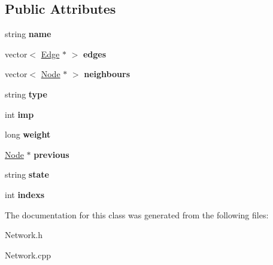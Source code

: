 \subsection*{\-Public \-Attributes}
\begin{DoxyCompactItemize}
\item 
\hypertarget{classNode_a4cd656d544174479df27f0759e5a3997}{string {\bfseries name}}\label{classNode_a4cd656d544174479df27f0759e5a3997}

\item 
\hypertarget{classNode_aae9ee63313be552829fe7004d4e47d7a}{vector$<$ \hyperlink{classEdge}{\-Edge} $\ast$ $>$ {\bfseries edges}}\label{classNode_aae9ee63313be552829fe7004d4e47d7a}

\item 
\hypertarget{classNode_adf620aca7a06a8e47c501e048fcfec6e}{vector$<$ \hyperlink{classNode}{\-Node} $\ast$ $>$ {\bfseries neighbours}}\label{classNode_adf620aca7a06a8e47c501e048fcfec6e}

\item 
\hypertarget{classNode_a4a9009dc3c11cefb48a2874cc40d4a8d}{string {\bfseries type}}\label{classNode_a4a9009dc3c11cefb48a2874cc40d4a8d}

\item 
\hypertarget{classNode_a9d9de6527652b93e793368cf08471b2b}{int {\bfseries imp}}\label{classNode_a9d9de6527652b93e793368cf08471b2b}

\item 
\hypertarget{classNode_ac6fb77552366017a891a315621640c6f}{long {\bfseries weight}}\label{classNode_ac6fb77552366017a891a315621640c6f}

\item 
\hypertarget{classNode_a17c0c1c22413b76152cd8f513a961022}{\hyperlink{classNode}{\-Node} $\ast$ {\bfseries previous}}\label{classNode_a17c0c1c22413b76152cd8f513a961022}

\item 
\hypertarget{classNode_a09db6fd58cbaccd097107cb5e6e62d59}{string {\bfseries state}}\label{classNode_a09db6fd58cbaccd097107cb5e6e62d59}

\item 
\hypertarget{classNode_a2364f48294a41c6632229fbe24aea3b5}{int {\bfseries indexs}}\label{classNode_a2364f48294a41c6632229fbe24aea3b5}

\end{DoxyCompactItemize}


\-The documentation for this class was generated from the following files\-:\begin{DoxyCompactItemize}
\item 
\-Network.\-h\item 
\-Network.\-cpp\end{DoxyCompactItemize}
